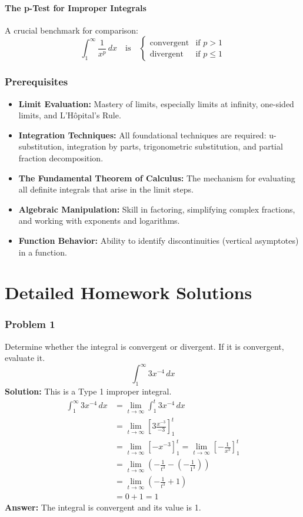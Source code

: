 \documentclass{article}
\begin{document}
\subsection{The p-Test for Improper Integrals}
A crucial benchmark for comparison:
\[ \int_{1}^{\infty} \frac{1}{x^p} \,dx \quad \text{is} \quad
\begin{cases}
    \text{convergent} & \text{if } p > 1 \\
    \text{divergent} & \text{if } p \le 1
\end{cases}
\]

\section{Prerequisites}
\begin{itemize}
    \item \textbf{Limit Evaluation:} Mastery of limits, especially limits at infinity, one-sided limits, and L'Hôpital's Rule.
    \item \textbf{Integration Techniques:} All foundational techniques are required: u-substitution, integration by parts, trigonometric substitution, and partial fraction decomposition.
    \item \textbf{The Fundamental Theorem of Calculus:} The mechanism for evaluating all definite integrals that arise in the limit steps.
    \item \textbf{Algebraic Manipulation:} Skill in factoring, simplifying complex fractions, and working with exponents and logarithms.
    \item \textbf{Function Behavior:} Ability to identify discontinuities (vertical asymptotes) in a function.
\end{itemize}

\part{Detailed Homework Solutions}

\section{Problem 1}
Determine whether the integral is convergent or divergent. If it is convergent, evaluate it.
\[ \int_{1}^{\infty} 3x^{-4} \,dx \]
\textbf{Solution:}
This is a Type 1 improper integral.
\begin{align*}
    \int_{1}^{\infty} 3x^{-4} \,dx &= \lim_{t \to \infty} \int_{1}^{t} 3x^{-4} \,dx \\
    &= \lim_{t \to \infty} \left[ 3 \frac{x^{-3}}{-3} \right]_{1}^{t} \\
    &= \lim_{t \to \infty} \left[ -x^{-3} \right]_{1}^{t} = \lim_{t \to \infty} \left[ -\frac{1}{x^3} \right]_{1}^{t} \\
    &= \lim_{t \to \infty} \left( -\frac{1}{t^3} - \left(-\frac{1}{1^3}\right) \right) \\
    &= \lim_{t \to \infty} \left( -\frac{1}{t^3} + 1 \right) \\
    &= 0 + 1 = 1
\end{align*}
\textbf{Answer:} The integral is convergent and its value is 1.
\end{document}
